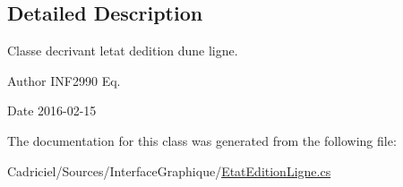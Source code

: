 \subsection{Detailed Description}
Classe decrivant l\textquotesingle{}etat d\textquotesingle{}edition d\textquotesingle{}une ligne. 

\begin{DoxyAuthor}{Author}
I\+N\+F2990 Eq. 
\end{DoxyAuthor}
\begin{DoxyDate}{Date}
2016-\/02-\/15 
\end{DoxyDate}


The documentation for this class was generated from the following file\+:\begin{DoxyCompactItemize}
\item 
Cadriciel/\+Sources/\+Interface\+Graphique/\hyperlink{_etat_edition_ligne_8cs}{Etat\+Edition\+Ligne.\+cs}\end{DoxyCompactItemize}

